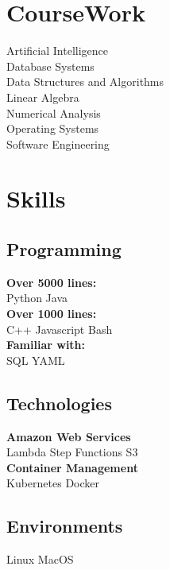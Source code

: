 \documentclass[letterpaper]{deedy-resume}
\begin{document}
\begin{minipage}[t]{0.33\textwidth}

\section{CourseWork}
Artificial Intelligence \\
Database Systems \\
Data Structures and Algorithms \\
Linear Algebra \\
Numerical Analysis \\
Operating Systems \\
Software Engineering \\
\sectionspace


\section{Skills}

\subsection{Programming}
\textbf{Over 5000 lines:} \\
Python \textbullet{} Java \\
\textbf{Over 1000 lines:} \\
C++ \textbullet{} Javascript \textbullet{} Bash \\
\textbf{Familiar with:} \\
SQL \textbullet{} YAML

\sectionspace
\subsection{Technologies}
\textbf{Amazon Web Services} \\
Lambda \textbullet{} Step Functions \textbullet{} S3\\
\textbf{Container Management} \\
Kubernetes \textbullet{} Docker


\sectionspace
\subsection{Environments}
Linux \textbullet{} MacOS

\sectionspace

\end{minipage}
\end{document}
